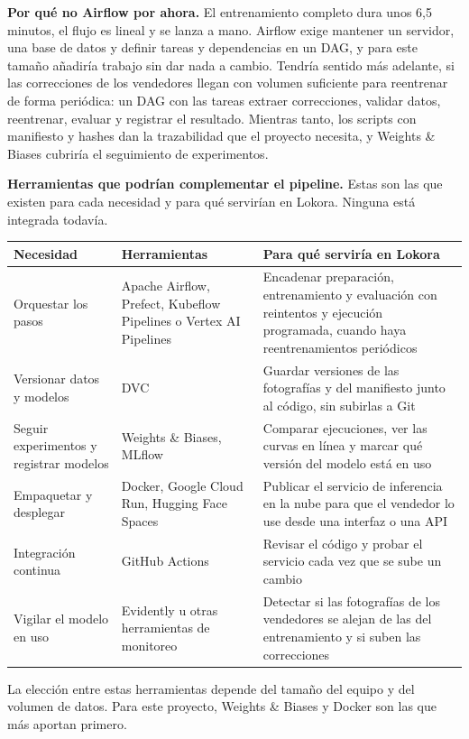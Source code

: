 \documentclass[11pt,a4paper]{article}
\begin{document}
\noindent \textbf{Por qué no Airflow por ahora.} El entrenamiento completo dura unos 6,5 minutos, el flujo es lineal y se lanza a mano. Airflow exige mantener un servidor, una base de datos y definir tareas y dependencias en un DAG, y para este tamaño añadiría trabajo sin dar nada a cambio. Tendría sentido más adelante, si las correcciones de los vendedores llegan con volumen suficiente para reentrenar de forma periódica: un DAG con las tareas extraer correcciones, validar datos, reentrenar, evaluar y registrar el resultado. Mientras tanto, los scripts con manifiesto y hashes dan la trazabilidad que el proyecto necesita, y Weights \& Biases cubriría el seguimiento de experimentos.\par
\noindent \textbf{Herramientas que podrían complementar el pipeline.} Estas son las que existen para cada necesidad y para qué servirían en Lokora. Ninguna está integrada todavía.\par
\begin{center}\small
\begin{tabularx}{\textwidth}{XXX}
\toprule
\textbf{Necesidad} & \textbf{Herramientas} & \textbf{Para qué serviría en Lokora} \\
\midrule
Orquestar los pasos & Apache Airflow, Prefect, Kubeflow Pipelines o Vertex AI Pipelines & Encadenar preparación, entrenamiento y evaluación con reintentos y ejecución programada, cuando haya reentrenamientos periódicos \\
Versionar datos y modelos & DVC & Guardar versiones de las fotografías y del manifiesto junto al código, sin subirlas a Git \\
Seguir experimentos y registrar modelos & Weights \& Biases, MLflow & Comparar ejecuciones, ver las curvas en línea y marcar qué versión del modelo está en uso \\
Empaquetar y desplegar & Docker, Google Cloud Run, Hugging Face Spaces & Publicar el servicio de inferencia en la nube para que el vendedor lo use desde una interfaz o una API \\
Integración continua & GitHub Actions & Revisar el código y probar el servicio cada vez que se sube un cambio \\
Vigilar el modelo en uso & Evidently u otras herramientas de monitoreo & Detectar si las fotografías de los vendedores se alejan de las del entrenamiento y si suben las correcciones \\
\bottomrule
\end{tabularx}
\end{center}
\noindent La elección entre estas herramientas depende del tamaño del equipo y del volumen de datos. Para este proyecto, Weights \& Biases y Docker son las que más aportan primero.\par
\end{document}
